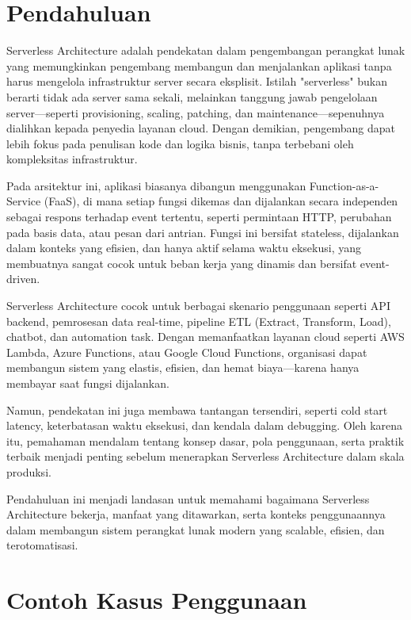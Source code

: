 \section{Pendahuluan}

Serverless Architecture adalah pendekatan dalam pengembangan perangkat lunak yang memungkinkan pengembang membangun dan menjalankan aplikasi tanpa harus mengelola infrastruktur server secara eksplisit. Istilah "serverless" bukan berarti tidak ada server sama sekali, melainkan tanggung jawab pengelolaan server—seperti provisioning, scaling, patching, dan maintenance—sepenuhnya dialihkan kepada penyedia layanan cloud. Dengan demikian, pengembang dapat lebih fokus pada penulisan kode dan logika bisnis, tanpa terbebani oleh kompleksitas infrastruktur.

Pada arsitektur ini, aplikasi biasanya dibangun menggunakan Function-as-a-Service (FaaS), di mana setiap fungsi dikemas dan dijalankan secara independen sebagai respons terhadap event tertentu, seperti permintaan HTTP, perubahan pada basis data, atau pesan dari antrian. Fungsi ini bersifat stateless, dijalankan dalam konteks yang efisien, dan hanya aktif selama waktu eksekusi, yang membuatnya sangat cocok untuk beban kerja yang dinamis dan bersifat event-driven.

Serverless Architecture cocok untuk berbagai skenario penggunaan seperti API backend, pemrosesan data real-time, pipeline ETL (Extract, Transform, Load), chatbot, dan automation task. Dengan memanfaatkan layanan cloud seperti AWS Lambda, Azure Functions, atau Google Cloud Functions, organisasi dapat membangun sistem yang elastis, efisien, dan hemat biaya—karena hanya membayar saat fungsi dijalankan.

Namun, pendekatan ini juga membawa tantangan tersendiri, seperti cold start latency, keterbatasan waktu eksekusi, dan kendala dalam debugging. Oleh karena itu, pemahaman mendalam tentang konsep dasar, pola penggunaan, serta praktik terbaik menjadi penting sebelum menerapkan Serverless Architecture dalam skala produksi.

Pendahuluan ini menjadi landasan untuk memahami bagaimana Serverless Architecture bekerja, manfaat yang ditawarkan, serta konteks penggunaannya dalam membangun sistem perangkat lunak modern yang scalable, efisien, dan terotomatisasi.

\section{Contoh Kasus Penggunaan}

